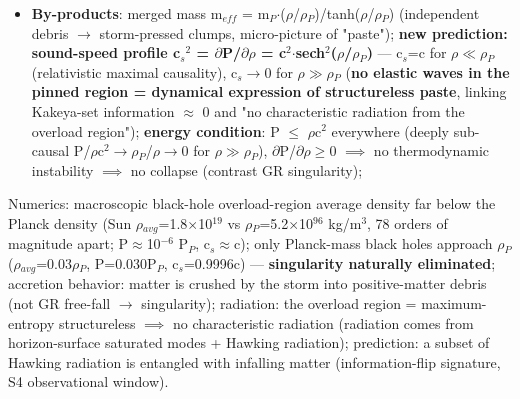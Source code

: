 \documentclass[12pt]{article}
\newcommand{\up}[1]{\ensuremath{^{#1}}}
\newcommand{\down}[1]{\ensuremath{_{#1}}}
\begin{document}
\begin{itemize}
\item \textbf{By-products}: merged mass m\down{eff} = m\down{P}\ensuremath{\cdot}(\ensuremath{\rho}/\ensuremath{\rho}\down{P})/tanh(\ensuremath{\rho}/\ensuremath{\rho}\down{P}) (independent debris \ensuremath{\to} storm-pressed clumps, micro-picture of "paste"); \textbf{new prediction: sound-speed profile c\down{s}\up{2} = \ensuremath{\partial}P/\ensuremath{\partial}\ensuremath{\rho} = c\up{2}\ensuremath{\cdot}sech\up{2}(\ensuremath{\rho}/\ensuremath{\rho}\down{P})} --- c\down{s}=c for \ensuremath{\rho}\ensuremath{\ll}\ensuremath{\rho}\down{P} (relativistic maximal causality), c\down{s}\ensuremath{\to}0 for \ensuremath{\rho}\ensuremath{\gg}\ensuremath{\rho}\down{P} (\textbf{no elastic waves in the pinned region = dynamical expression of structureless paste}, linking Kakeya-set information \ensuremath{\approx} 0 and "no characteristic radiation from the overload region"); \textbf{energy condition}: P \ensuremath{\leq} \ensuremath{\rho}c\up{2} everywhere (deeply sub-causal P/\ensuremath{\rho}c\up{2}\ensuremath{\to}\ensuremath{\rho}\down{P}/\ensuremath{\rho}\ensuremath{\to}0 for \ensuremath{\rho}\ensuremath{\gg}\ensuremath{\rho}\down{P}), \ensuremath{\partial}P/\ensuremath{\partial}\ensuremath{\rho}\ensuremath{\geq}0 \ensuremath{\implies} no thermodynamic instability \ensuremath{\implies} no collapse (contrast GR singularity);
\end{itemize}
Numerics: macroscopic black-hole overload-region average density far below the Planck density (Sun \ensuremath{\rho}\down{avg}=1.8\ensuremath{\times}10\up{19} vs \ensuremath{\rho}\down{P}=5.2\ensuremath{\times}10\up{96} kg/m\up{3}, 78 orders of magnitude apart; P\ensuremath{\approx}10\up{-6} P\down{P}, c\down{s}\ensuremath{\approx}c); only Planck-mass black holes approach \ensuremath{\rho}\down{P} (\ensuremath{\rho}\down{avg}=0.03\ensuremath{\rho}\down{P}, P=0.030P\down{P}, c\down{s}=0.9996c) --- \textbf{singularity naturally eliminated}; accretion behavior: matter is crushed by the storm into positive-matter debris (not GR free-fall \ensuremath{\to} singularity); radiation: the overload region = maximum-entropy structureless \ensuremath{\implies} no characteristic radiation (radiation comes from horizon-surface saturated modes + Hawking radiation); prediction: a subset of Hawking radiation is entangled with infalling matter (information-flip signature, S4 observational window).
\end{document}
